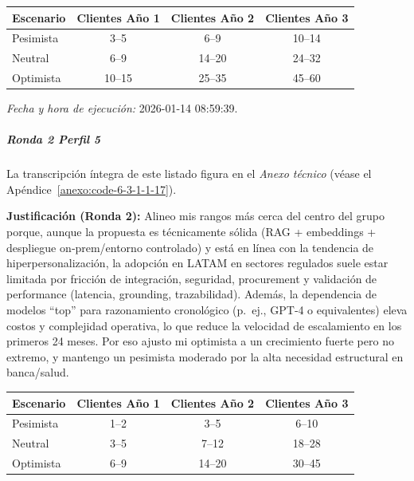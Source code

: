 \begin{center}
\footnotesize
\begin{tabular}{|l|c|c|c|}
\hline
\textbf{Escenario} & \textbf{Clientes Año 1} & \textbf{Clientes Año 2} & \textbf{Clientes Año 3} \\
\hline
Pesimista & 3--5 & 6--9 & 10--14 \\
\hline
Neutral & 6--9 & 14--20 & 24--32 \\
\hline
Optimista & 10--15 & 25--35 & 45--60 \\
\hline
\end{tabular}
\end{center}

\textit{Fecha y hora de ejecución:} 2026-01-14 08:59:39.

\subparagraph{Ronda 2 Perfil 5}

La transcripción íntegra de este listado figura en el \textit{Anexo técnico} (véase el Apéndice~\ref{anexo:code-6-3-1-1-17}).

\textbf{Justificación (Ronda 2):} Alineo mis rangos más cerca del centro del grupo porque, aunque la propuesta es técnicamente sólida (RAG + embeddings + despliegue on‑prem/entorno controlado) y está en línea con la tendencia de hiperpersonalización, la adopción en LATAM en sectores regulados suele estar limitada por fricción de integración, seguridad, procurement y validación de performance (latencia, grounding, trazabilidad). Además, la dependencia de modelos ``top'' para razonamiento cronológico (p.\ ej., GPT‑4 o equivalentes) eleva costos y complejidad operativa, lo que reduce la velocidad de escalamiento en los primeros 24 meses. Por eso ajusto mi optimista a un crecimiento fuerte pero no extremo, y mantengo un pesimista moderado por la alta necesidad estructural en banca/salud.

\begin{center}
\footnotesize
\begin{tabular}{|l|c|c|c|}
\hline
\textbf{Escenario} & \textbf{Clientes Año 1} & \textbf{Clientes Año 2} & \textbf{Clientes Año 3} \\
\hline
Pesimista & 1--2 & 3--5 & 6--10 \\
\hline
Neutral & 3--5 & 7--12 & 18--28 \\
\hline
Optimista & 6--9 & 14--20 & 30--45 \\
\hline
\end{tabular}
\end{center}

